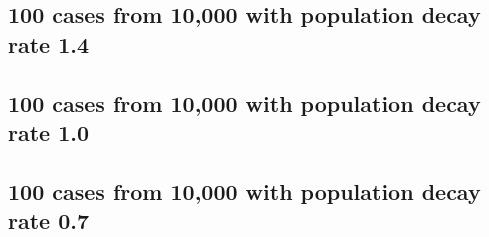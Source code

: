 \subsection{100 cases from 10,000 with population decay rate 1.4}
\begin{table}[H]
\centering
\scriptsize

    \begin{subtable}{0.5\textwidth}
    
    \caption{Means} 
    \end{subtable}%
    \begin{subtable}{0.5\textwidth}
    
    \caption{Standard deviations} 
    \end{subtable}

\caption{Error rates for uniform population of 10,000, single peak intensity of factor 100 and decay rate 1.4}
\label{tbl:mean_error_rates:p1.4_100_1_1h}
\end{table}

\subsection{100 cases from 10,000 with population decay rate 1.0}
\begin{table}[H]
\centering
\scriptsize

    \begin{subtable}{0.5\textwidth}
    
    \caption{Means} 
    \end{subtable}%
    \begin{subtable}{0.5\textwidth}
    
    \caption{Standard deviations} 
    \end{subtable}

\caption{Error rates for uniform population of 10,000, single peak intensity of factor 100 and decay rate 1.0}
\label{tbl:mean_error_rates:p1.0_100_1_1h}
\end{table}

\subsection{100 cases from 10,000 with population decay rate 0.7}
\begin{table}[H]
\centering
\scriptsize

    \begin{subtable}{0.5\textwidth}
    
    \caption{Means} 
    \end{subtable}
    \begin{subtable}{0.5\textwidth}
    
    \caption{Standard deviations} 
    \end{subtable}

\caption{Error rates for uniform population of 10,000, single peak intensity of factor 100 and decay rate 0.7}
\label{tbl:mean_error_rates:p0.7_100_1_1h}
\end{table}


